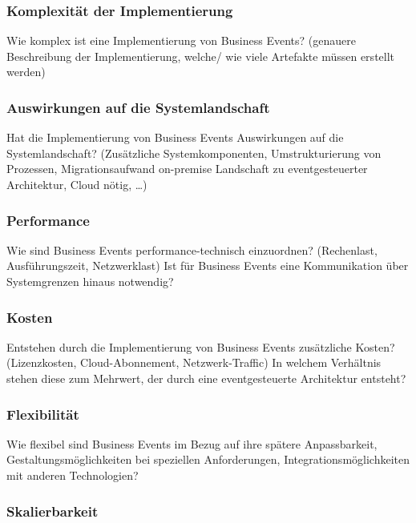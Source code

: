 \subsubsection{Komplexität der Implementierung}

Wie komplex ist eine Implementierung von Business Events? (genauere Beschreibung der Implementierung, welche/ wie viele Artefakte müssen erstellt werden)

\subsubsection{Auswirkungen auf die Systemlandschaft}

Hat die Implementierung von Business Events Auswirkungen auf die Systemlandschaft? (Zusätzliche Systemkomponenten, Umstrukturierung von Prozessen, Migrationsaufwand on-premise Landschaft zu eventgesteuerter Architektur, Cloud nötig, …)

\subsubsection{Performance}

Wie sind Business Events performance-technisch einzuordnen? (Rechenlast, Ausführungszeit, Netzwerklast) \newline
Ist für Business Events eine Kommunikation über Systemgrenzen hinaus notwendig?

\subsubsection{Kosten}

Entstehen durch die Implementierung von Business Events zusätzliche Kosten? (Lizenzkosten, Cloud-Abonnement, Netzwerk-Traffic) \newline
In welchem Verhältnis stehen diese zum Mehrwert, der durch eine eventgesteuerte Architektur entsteht?

\subsubsection{Flexibilität}

Wie flexibel sind Business Events im Bezug auf ihre spätere Anpassbarkeit, Gestaltungsmöglichkeiten bei speziellen Anforderungen, Integrationsmöglichkeiten mit anderen Technologien?

\subsubsection{Skalierbarkeit}

